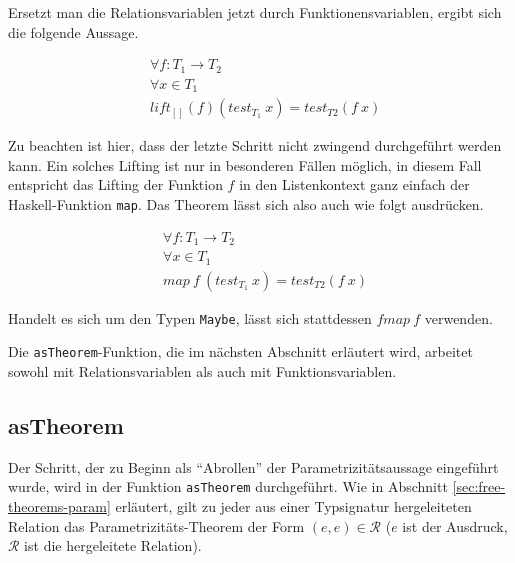 Ersetzt man die Relationsvariablen jetzt durch Funktionensvariablen, ergibt sich die folgende Aussage.

\begin{align*}
& \forall f : T_1 \rightarrow T_2 \\
& \forall x \in T_1 \\
& lift_{[]}(f) (test_{T_1}\ x) = test_{T2} (f\ x)
\end{align*}

Zu beachten ist hier, dass der letzte Schritt nicht zwingend durchgeführt werden kann. Ein solches Lifting ist nur in besonderen
Fällen möglich, in diesem Fall entspricht das Lifting der Funktion $f$ in den Listenkontext ganz einfach der Haskell-Funktion
\texttt{map}. Das Theorem lässt sich also auch wie folgt ausdrücken.

\begin{align*}
& \forall f : T_1 \rightarrow T_2 \\
& \forall x \in T_1 \\
& map\ f\ (test_{T_1}\ x) = test_{T2} (f\ x)
\end{align*}

Handelt es sich um den Typen \texttt{Maybe}, lässt sich stattdessen $fmap\ f$ verwenden.

Die \texttt{asTheorem}-Funktion, die im nächsten Abschnitt erläutert wird, arbeitet sowohl mit Relationsvariablen als auch mit
Funktionsvariablen.



\subsection{asTheorem}

Der Schritt, der zu Beginn als ``Abrollen'' der Parametrizitätsaussage eingeführt wurde, wird in der Funktion \texttt{asTheorem}
durchgeführt. Wie in Abschnitt \ref{sec:free-theorems-param} erläutert, gilt zu jeder aus einer Typsignatur hergeleiteten
Relation das Parametrizitäts-Theorem der Form $(e, e) \in \mathcal{R}$ ($e$ ist der Ausdruck, $\mathcal{R}$ ist die hergeleitete
Relation).

